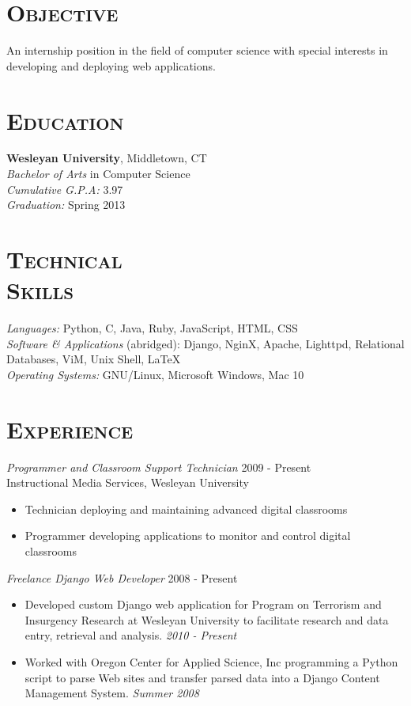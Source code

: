 \documentclass[margin]{res}
\begin{document}
\begin{resume}
\section{\textsc{Objective}} An internship position in the field of computer science with special interests in developing and deploying web applications.

\section{\textsc{Education}} {\bf Wesleyan University}, Middletown, CT \\ {\sl Bachelor of Arts} in Computer Science \\
    {\sl Cumulative G.P.A:} 3.97 \\
    {\sl Graduation:} Spring 2013
 
 
\section{\textsc{Technical \\ Skills}}
    {\sl Languages:} Python, C, Java, Ruby, JavaScript, HTML, CSS \\
    {\sl Software \& Applications} (abridged): Django, NginX, Apache, Lighttpd, Relational Databases, ViM, Unix Shell, \LaTeX \\
    {\sl Operating Systems:} GNU/Linux, Microsoft Windows, Mac 10

\section{\textsc{Experience}}
    {\sl Programmer and Classroom Support Technician} \hfill 2009 - Present \\
    Instructional Media Services, Wesleyan University
    \begin{itemize}  \itemsep -2pt %
        \item Technician deploying and maintaining advanced digital classrooms
        \item Programmer developing applications to monitor and control digital classrooms
    \end{itemize}

    {\sl Freelance Django Web Developer} \hfill 2008 - Present
    \begin{itemize}  \itemsep -2pt %
        \item Developed custom Django web application for Program on Terrorism and Insurgency Research at Wesleyan University to facilitate research and data entry, retrieval and analysis. {\sl 2010 - Present}
        \item Worked with Oregon Center for Applied Science, Inc programming a Python script to parse Web sites and transfer parsed data into a Django Content Management System. {\sl Summer 2008}
    \end{itemize}


\end{resume}
\end{document}

